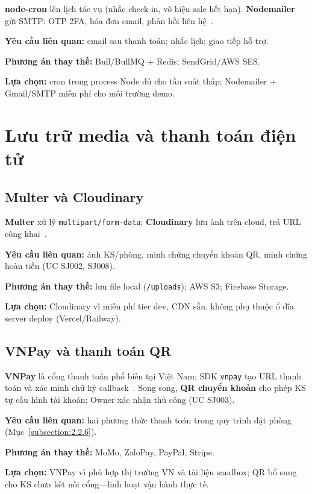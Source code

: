 \documentclass[../DoAn.tex]{subfiles}
\begin{document}
\textbf{node-cron} lên lịch tác vụ (nhắc check-in, vô hiệu sale hết hạn). \textbf{Nodemailer} gửi SMTP: OTP 2FA, hóa đơn email, phản hồi liên hệ~\cite{nodemailer2024}.

\textbf{Yêu cầu liên quan:} email sau thanh toán; nhắc lịch; giao tiếp hỗ trợ.

\textbf{Phương án thay thế:} Bull/BullMQ + Redis; SendGrid/AWS SES.

\textbf{Lựa chọn:} cron trong process Node đủ cho tần suất thấp; Nodemailer + Gmail/SMTP miễn phí cho môi trường demo.

\section{Lưu trữ media và thanh toán điện tử}
\label{section:3.7}

\subsection{Multer và Cloudinary}

\textbf{Multer} xử lý \texttt{multipart/form-data}; \textbf{Cloudinary} lưu ảnh trên cloud, trả URL công khai~\cite{cloudinary2024}.

\textbf{Yêu cầu liên quan:} ảnh KS/phòng, minh chứng chuyển khoản QR, minh chứng hoàn tiền (UC SJ002, SJ008).

\textbf{Phương án thay thế:} lưu file local (\texttt{/uploads}); AWS S3; Firebase Storage.

\textbf{Lựa chọn:} Cloudinary vì miễn phí tier dev, CDN sẵn, không phụ thuộc ổ đĩa server deploy (Vercel/Railway).

\subsection{VNPay và thanh toán QR}

\textbf{VNPay} là cổng thanh toán phổ biến tại Việt Nam; SDK \texttt{vnpay} tạo URL thanh toán và xác minh chữ ký callback~\cite{vnpay2024}. Song song, \textbf{QR chuyển khoản} cho phép KS tự cấu hình tài khoản; Owner xác nhận thủ công (UC SJ003).

\textbf{Yêu cầu liên quan:} hai phương thức thanh toán trong quy trình đặt phòng (Mục~\ref{subsection:2.2.6}).

\textbf{Phương án thay thế:} MoMo, ZaloPay, PayPal, Stripe.

\textbf{Lựa chọn:} VNPay vì phù hợp thị trường VN và tài liệu sandbox; QR bổ sung cho KS chưa kết nối cổng---linh hoạt vận hành thực tế.
\end{document}
